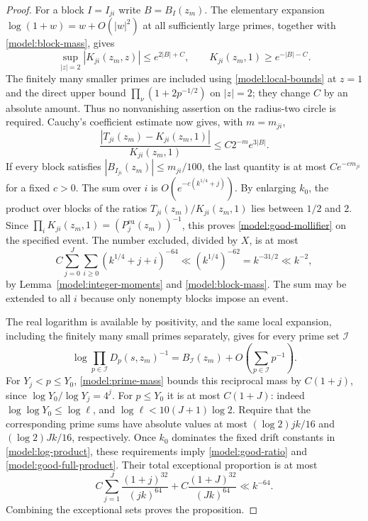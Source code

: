 \begin{proof}
For a block $I=I_{ji}$ write $B=B_I(z_m)$.  The elementary expansion
$\log(1+w)=w+O(|w|^2)$ at all sufficiently large primes, together with
\eqref{model:block-mass}, gives
\begin{equation}
 \sup_{|z|=2}|K_{ji}(z_m,z)|\le e^{2|B|+C},
 \qquad K_{ji}(z_m,1)\ge e^{-|B|-C}.
 \label{model:pointwise-block}
\end{equation}
The finitely many smaller primes are included using
\eqref{model:local-bounds} at $z=1$ and the direct upper bound
$\prod_{\nu}(1+2p^{-1/2})$ on $|z|=2$; they change $C$ by an absolute
amount.  Thus no nonvanishing assertion on the radius-two circle is
required.  Cauchy's coefficient estimate now gives, with $m=m_{ji}$,
\[
 \frac{|T_{ji}(z_m)-K_{ji}(z_m,1)|}{K_{ji}(z_m,1)}
 \le C2^{-m}e^{3|B|}.
\]
If every block satisfies $|B_{I_{ji}}(z_m)|\le m_{ji}/100$, the last
quantity is at most $Ce^{-c m_{ji}}$ for a fixed $c>0$.  The sum over
$i$ is $O(e^{-c(k^{1/4}+j)})$.  By enlarging $k_0$, the product over
blocks of the ratios $T_{ji}(z_m)/K_{ji}(z_m,1)$ lies between $1/2$
and $2$.
Since $\prod_iK_{ji}(z_m,1)=(P_j^{\mathrm{eu}}(z_m))^{-1}$,
this proves \eqref{model:good-mollifier} on the specified event.
The number excluded, divided by $X$, is at most
\[
 C\sum_{j=0}^J\sum_{i\ge0}(k^{1/4}+j+i)^{-64}
 \ll (k^{1/4})^{-62}=k^{-31/2}\ll k^{-2},
\]
by Lemma~\ref{model:integer-moments} and
\eqref{model:block-mass}.  The sum may be extended to all $i$ because
only nonempty blocks impose an event.

The real logarithm is available by positivity, and the same local
expansion, including the finitely many small primes separately, gives
for every prime set $\mathcal I$
\begin{equation}
 \log\prod_{p\in\mathcal I}D_p(s,z_m)^{-1}
 =B_{\mathcal I}(z_m)+O\left(\sum_{p\in\mathcal I}p^{-1}\right).
 \label{model:log-product}
\end{equation}
For $Y_j<p\le Y_0$, \eqref{model:prime-mass} bounds this reciprocal
mass by $C(1+j)$, since $\log Y_0/\log Y_j=4^j$.
For $p\le Y_0$ it is at most $C(1+J)$: indeed
$\log\log Y_0\le\log\ell$, and
$\log\ell<10(J+1)\log2$.
Require that the corresponding prime sums have absolute values at
most $(\log2)jk/16$ and $(\log2)Jk/16$, respectively.
Once $k_0$ dominates the fixed drift constants in
\eqref{model:log-product}, these requirements imply
\eqref{model:good-ratio} and \eqref{model:good-full-product}.
Their total exceptional proportion is at most
\[
 C\sum_{j=1}^J\frac{(1+j)^{32}}{(jk)^{64}}
   +C\frac{(1+J)^{32}}{(Jk)^{64}}
 \ll k^{-64}.
\]
Combining the exceptional sets proves the proposition.
\end{proof}

